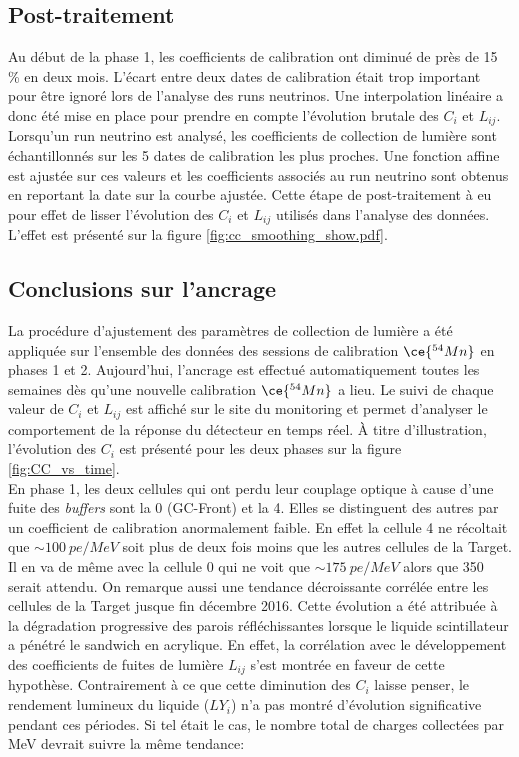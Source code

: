 \subsection{Post-traitement}

Au début de la phase 1, les coefficients de calibration ont diminué de près de 15 \% en deux mois. L'écart entre deux dates de calibration était trop important pour être ignoré lors de l'analyse des runs neutrinos. Une interpolation linéaire a donc été mise en place pour prendre en compte l'évolution brutale des $C_i$ et $L_{ij}$. Lorsqu'un run neutrino est analysé, les coefficients de collection de lumière sont échantillonnés sur les 5 dates de calibration les plus proches. Une fonction affine est ajustée sur ces valeurs et les coefficients associés au run neutrino sont obtenus en reportant la date sur la courbe ajustée. Cette étape de post-traitement à eu pour effet de lisser l'évolution des $C_i$ et $L_{ij}$ utilisés dans l'analyse des données. L'effet est présenté sur la figure \ref{fig:cc_smoothing_show.pdf}.

\bigbreak


\subsection{Conclusions sur l'ancrage}
\label{sec:cc_encrage}

La procédure d'ajustement des paramètres de collection de lumière a été appliquée sur l'ensemble des données des sessions de calibration $\ce{^{54}Mn}$ en phases 1 et 2. Aujourd'hui, l'ancrage est effectué automatiquement toutes les semaines dès qu'une nouvelle calibration $\ce{^{54}Mn}$ a lieu. Le suivi de chaque valeur de $C_i$ et $L_{ij}$ est affiché sur le site du monitoring et permet d'analyser le comportement de la réponse du détecteur en temps réel. À titre d'illustration, l'évolution des $C_i$ est présenté pour les deux phases sur la figure \ref{fig:CC_vs_time}.\\

En phase 1, les deux cellules qui ont perdu leur couplage optique à cause d'une fuite des \textit{buffers} sont la 0 (GC-Front) et la 4. Elles se distinguent des autres par un coefficient de calibration anormalement faible. En effet la cellule 4 ne récoltait que $\sim \SI{100}{pe/MeV}$ soit plus de deux fois moins que les autres cellules de la Target. Il en va de même avec la cellule 0 qui ne voit que $\sim \SI{175}{pe/MeV}$ alors que 350 serait attendu. On remarque aussi une tendance décroissante corrélée entre les cellules de la Target jusque fin décembre 2016. Cette évolution a été attribuée à la dégradation progressive des parois réfléchissantes lorsque le liquide scintillateur a pénétré le sandwich en acrylique. En effet, la corrélation avec le développement des coefficients de fuites de lumière $L_{ij}$ s'est montrée en faveur de cette hypothèse. Contrairement à ce que cette diminution des $C_i$ laisse penser, le rendement lumineux du liquide ($LY_i$) n'a pas montré d'évolution significative pendant ces périodes. Si tel était le cas, le nombre total de charges collectées par MeV devrait suivre la même tendance:

